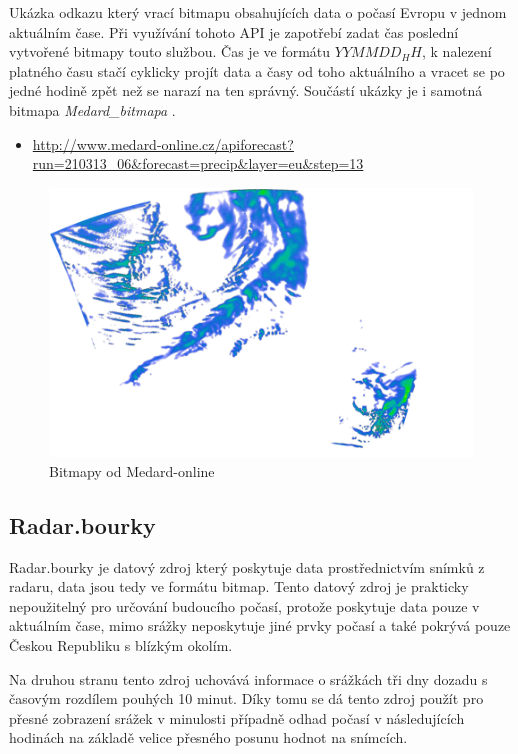 \documentclass[czech,bachelor,dept460,male,csharp,cpdeclaration]{diploma}
\begin{document}
	Ukázka odkazu který vrací bitmapu obsahujících data o počasí Evropu v jednom aktuálním čase. Při využívání tohoto API je zapotřebí zadat čas poslední vytvořené bitmapy touto službou. Čas je ve formátu $YYMMDD_HH$, k nalezení platného času stačí cyklicky projít data a časy od toho aktuálního a vracet se po jedné hodině zpět než se narazí na ten správný. Součástí ukázky je i samotná bitmapa \emph{Medard\_bitmapa} \cite{medard}.
	
	\begin{itemize}
		\item \url{http://www.medard-online.cz/apiforecast?run=210313\_06\&forecast=precip\&layer=eu\&step=13}
	\end{itemize}
	
	\begin{figure}
		\centering
		\includegraphics[scale=0.5]{Data/Mdrd_ukazka.png}
		\caption{Bitmapy od Medard-online \cite{medard}}
	\end{figure}
	
	\subsection{Radar.bourky}
	
	Radar.bourky \cite{chmi} je datový zdroj který poskytuje data prostřednictvím snímků z radaru, data jsou tedy ve formátu bitmap. Tento datový zdroj je prakticky nepoužitelný pro určování budoucího počasí, protože poskytuje data pouze v aktuálním čase, mimo srážky neposkytuje jiné prvky počasí a také pokrývá pouze Českou Republiku s blízkým okolím.
	
	Na druhou stranu tento zdroj uchovává informace o srážkách tři dny dozadu s časovým rozdílem pouhých 10 minut. Díky tomu se dá tento zdroj použít pro přesné zobrazení srážek v minulosti případně odhad počasí v následujících hodinách na základě velice přesného posunu hodnot na snímcích.
	
\end{document}
